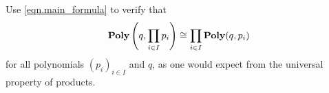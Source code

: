 \documentclass[Book-Poly]{subfiles}
\begin{document}
\begin{exercise}%
	
	
	Use \eqref{eqn.main_formula}
	to verify that
	\[
	    \mathbf{Poly}\left(q, \prod_{i \in I} p_i\right) \cong \prod_{i \in I} \mathbf{Poly}(q, p_i)
	\]
	for all polynomials $(p_i)_{i \in I}$ and $q$, as one would expect from the universal property of products.
\qedhere
\begin{solution}
    
    

\end{solution}
\end{exercise}
\end{document}
